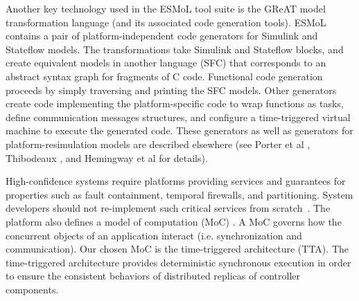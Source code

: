 Another key technology used in the ESMoL tool suite is the GReAT model transformation language (and its
associated code generation tools)\cite{mic:great}.  ESMoL contains a pair of platform-independent code
generators for Simulink and Stateflow models.  The transformations take Simulink and Stateflow blocks, and
create equivalent models in another language (SFC) that corresponds to an abstract syntax graph for 
fragments of C code.  Functional code generation proceeds by simply traversing and printing the SFC 
models. Other generators create code implementing the platform-specific code to wrap functions as tasks, 
define communication messages structures, and configure a time-triggered virtual machine to execute the
generated code.  These generators as well as generators for platform-resimulation models are described
elsewhere (see Porter et al \cite{modeling:esmol}, Thibodeaux \cite{timed:frodo}, and Hemingway et al
\cite{modeling:truetime} for details).

High-confidence systems require platforms providing services and guarantees for properties such as fault 
containment, temporal firewalls, and partitioning.  System developers should not re-implement such 
critical services from scratch~\cite{modeling:platform}.  The platform also defines a 
model of computation (MoC) \cite{sem:taggedsig}. A MoC governs how the concurrent objects of an 
application interact (i.e. synchronization and communication).  Our chosen MoC is the time-triggered
architecture (TTA)\cite{timed:tta}.  The time-triggered architecture provides deterministic synchronous
execution in order to ensure the consistent behaviors of distributed replicas of controller components.  


